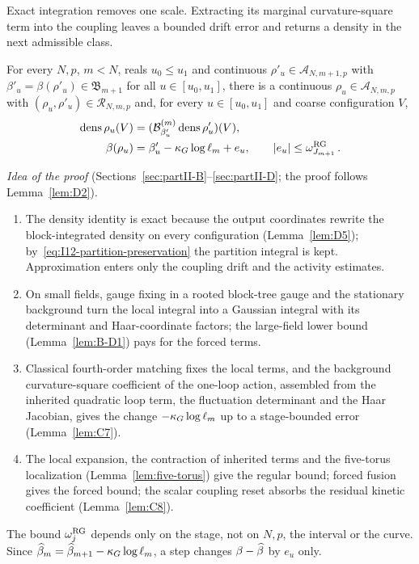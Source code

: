 Exact integration removes one scale. Extracting its marginal curvature-square term into the coupling leaves a bounded drift error and returns a density in the next admissible class.

\begin{theorem}\label{prop:RG}
For every $N,p$, $m<N$, reals $u_0\le u_1$ and continuous $\rho'_u\in\mathcal A_{N,m+1,p}$ with $\beta'_u=\beta(\rho'_u)\in\mathfrak B_{m+1}$ for all $u\in[u_0,u_1]$, there is a continuous $\rho_u\in\mathcal A_{N,m,p}$ with $(\rho_u,\rho'_u)\in\mathcal R_{N,m,p}$ and, for every $u\in[u_0,u_1]$ and coarse configuration $V$,
\begin{align*}
\operatorname{dens}\rho_u(V)&=(\mathcal{B}^{(m)}_{\beta'_u}\operatorname{dens}\rho'_u)(V),\\
\beta(\rho_u)&=\beta'_u-\kappa_G\log\ell_m+e_u,
\qquad |e_u|\le\omega_{J_{m+1}}^{\rm RG}\,.
\end{align*}
\end{theorem}

\emph{Idea of the proof} (Sections~\ref{sec:partII-B}--\ref{sec:partII-D}; the proof follows Lemma~\ref{lem:D2}).
\begin{enumerate}[label=\textup{Step \arabic*.},leftmargin=4.2em,nosep]
\item The density identity is exact because the output coordinates rewrite the block-integrated density on every configuration (Lemma~\ref{lem:D5}); by~\eqref{eq:I12-partition-preservation} the partition integral is kept. Approximation enters only the coupling drift and the activity estimates.
\item On small fields, gauge fixing in a rooted block-tree gauge and the stationary background turn the local integral into a Gaussian integral with its determinant and Haar-coordinate factors; the large-field lower bound (Lemma~\ref{lem:B-D1}) pays for the forced terms.
\item Classical fourth-order matching fixes the local terms, and the background curvature-square coefficient of the one-loop action, assembled from the inherited quadratic loop term, the fluctuation determinant and the Haar Jacobian, gives the change $-\kappa_G\log\ell_m$ up to a stage-bounded error (Lemma~\ref{lem:C7}).
\item The local expansion, the contraction of inherited terms and the five-torus localization (Lemma~\ref{lem:five-torus}) give the regular bound; forced fusion gives the forced bound; the scalar coupling reset absorbs the residual kinetic coefficient (Lemma~\ref{lem:C8}).
\end{enumerate}
The bound $\omega_j^{\rm RG}$ depends only on the stage, not on $N,p$, the interval or the curve. Since $\widehat{\beta}_m=\widehat{\beta}_{m+1}-\kappa_G\log\ell_m$, a step changes $\beta-\widehat{\beta}$ by $e_u$ only.

